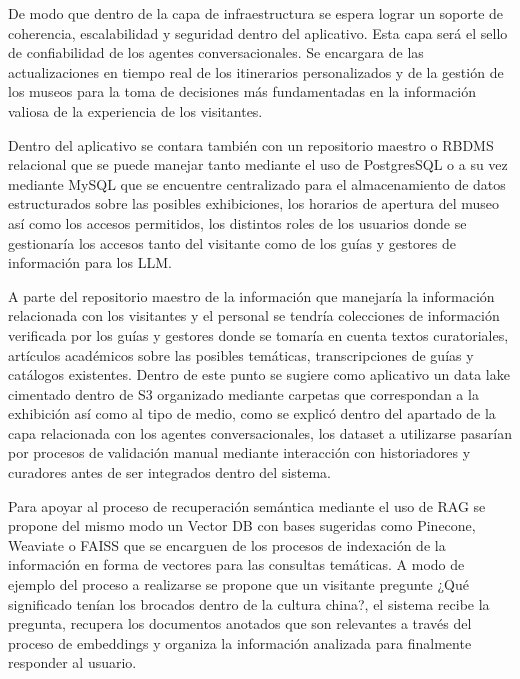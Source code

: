 \documentclass[pdflatex,sn-mathphys-num]{sn-jnl}%
\theoremstyle{thmstyleone}%
\theoremstyle{thmstyletwo}%
\theoremstyle{thmstylethree}%
\begin{document}
De modo que dentro de la capa de infraestructura se espera lograr un soporte de coherencia, escalabilidad y seguridad dentro del aplicativo. Esta capa será el sello de confiabilidad de los agentes conversacionales. Se encargara de las actualizaciones en tiempo real de los itinerarios personalizados y de la gestión de los museos para la toma de decisiones más fundamentadas en la información valiosa de la experiencia de los visitantes. 

Dentro del aplicativo se contara también con un repositorio maestro o RBDMS relacional que se puede manejar tanto mediante el uso de PostgresSQL o a su vez mediante MySQL que se encuentre centralizado para el almacenamiento de datos estructurados sobre las posibles exhibiciones, los horarios de apertura del museo así como los accesos permitidos, los distintos roles de los usuarios donde se gestionaría los accesos tanto del visitante como de los guías y gestores de información para los LLM.

A parte del repositorio maestro de la información que manejaría la información relacionada con los visitantes y el personal se tendría colecciones de información verificada por los guías y gestores donde se tomaría en cuenta textos curatoriales, artículos académicos sobre las posibles temáticas, transcripciones de guías y catálogos existentes. Dentro de este punto se sugiere como aplicativo un data lake cimentado dentro de S3 organizado mediante carpetas que correspondan a la exhibición así como al tipo de medio, como se explicó dentro del apartado de la capa relacionada con los agentes conversacionales, los dataset a utilizarse pasarían por procesos de validación manual mediante interacción con historiadores y curadores antes de ser integrados dentro del sistema.

Para apoyar al proceso de recuperación semántica mediante el uso de RAG se propone del mismo modo un Vector DB con bases sugeridas como Pinecone, Weaviate o FAISS que se encarguen de los procesos de indexación de la información en forma de vectores para las consultas temáticas. A modo de ejemplo del proceso a realizarse se propone que un visitante pregunte ¿Qué significado tenían los brocados dentro de la cultura china?, el sistema recibe la pregunta, recupera los documentos anotados que son relevantes a través del proceso de embeddings y organiza la información analizada para finalmente responder al usuario.
\end{document}
